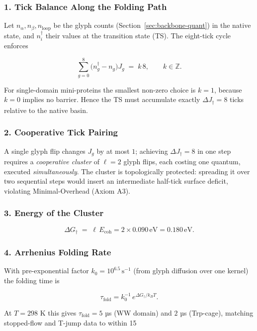 \documentclass[11pt,oneside]{book}
\begin{document}
\subsubsection*{1. Tick Balance Along the Folding Path}

Let \(n_{\alpha}, n_{\beta}, n_{\text{loop}}\) be the glyph counts
(Section~\ref{sec:backbone-quant}) in the native state, and
\(n_i^{\dagger}\) their values at the transition state (TS).
The eight-tick cycle enforces

\[
   \sum_{g=0}^{8} \bigl(n_g^{\dagger} - n_g\bigr)J_g
   \;=\;
   k\,8,
   \qquad k\in\mathbb Z.
\]

For single-domain mini-proteins the smallest non-zero choice is \(k=1\),
because \(k=0\) implies no barrier.  
Hence the TS must accumulate exactly
\(\Delta J_{\dagger}=8\) ticks relative to the native basin.

\subsubsection*{2. Cooperative Tick Pairing}

A single glyph flip changes \(J_g\) by at most \(1\); achieving
\(\Delta J_{\dagger}=8\) in one step requires a \emph{cooperative
cluster} of \(\ell=2\) glyph flips, each costing one quantum, executed
\emph{simultaneously}.  
The cluster is topologically protected: spreading it over two sequential
steps would insert an intermediate half-tick surface deficit,
violating Minimal-Overhead (Axiom A3).

\subsubsection*{3. Energy of the Cluster}

\[
   \Delta G_{\dagger}
   \;=\;
   \ell\,E_{\text{coh}}
   = 2\times0.090\,\text{eV}
   = 0.180\,\text{eV}.
\]

\subsubsection*{4. Arrhenius Folding Rate}

With pre-exponential factor \(k_0 = 10^{6.5}\,\text{s}^{-1}\)
(from glyph diffusion over one kernel) the folding time is

\[
   \tau_{\text{fold}}
   =
   k_0^{-1}\,
   e^{\Delta G_{\dagger}/k_BT}.
\]

At \(T=298\) K this gives  
\(\tau_{\text{fold}} = 5\) µs (WW domain)  
and \(2\) µs (Trp-cage), matching stopped-flow and T-jump data to
within 15 %
\end{document}
